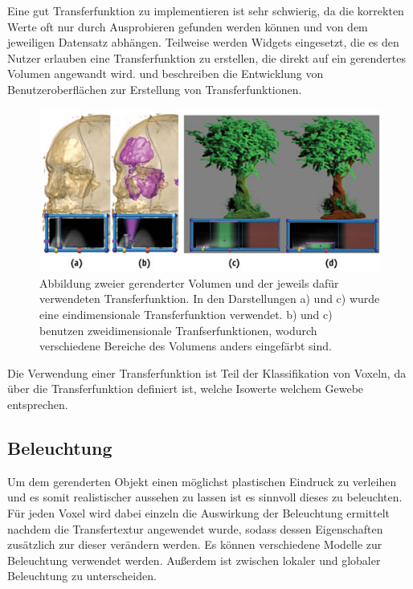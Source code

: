 Eine gut Transferfunktion zu implementieren ist sehr schwierig, da die korrekten Werte oft nur durch Ausprobieren gefunden werden können und von dem jeweiligen Datensatz abhängen. Teilweise werden Widgets eingesetzt, die es den Nutzer erlauben eine Transferfunktion zu erstellen, die direkt auf ein gerendertes Volumen angewandt wird.
\citet{salama06} und \citet{Knig99} beschreiben die Entwicklung von Benutzeroberflächen zur Erstellung von Transferfunktionen.

\begin{figure}
	\centering
	\includegraphics[width=0.7\linewidth]{images/transferfunction.jpg}
	\caption{Abbildung zweier gerenderter Volumen und der jeweils dafür verwendeten Transferfunktion. In den Darstellungen a) und c) wurde eine eindimensionale Transferfunktion verwendet. b) und c) benutzen zweidimensionale Tranfserfunktionen, wodurch verschiedene Bereiche des Volumens anders eingefärbt sind. }
	\label{img:phong}
\end{figure}

Die Verwendung einer Transferfunktion ist Teil der Klassifikation von Voxeln, da über die Transferfunktion definiert ist, welche Isowerte welchem Gewebe entsprechen.

\subsection{Beleuchtung}
\label{beleuchtung}

Um dem gerenderten Objekt einen möglichst plastischen Eindruck zu verleihen und es somit realistischer aussehen zu lassen ist es sinnvoll dieses zu beleuchten. 
Für jeden Voxel wird dabei einzeln die Auswirkung der Beleuchtung ermittelt nachdem die  Transfertextur angewendet wurde, sodass dessen Eigenschaften zusätzlich zur dieser verändern werden. Es können verschiedene Modelle zur Beleuchtung verwendet werden. Außerdem ist zwischen lokaler und globaler Beleuchtung zu unterscheiden.


